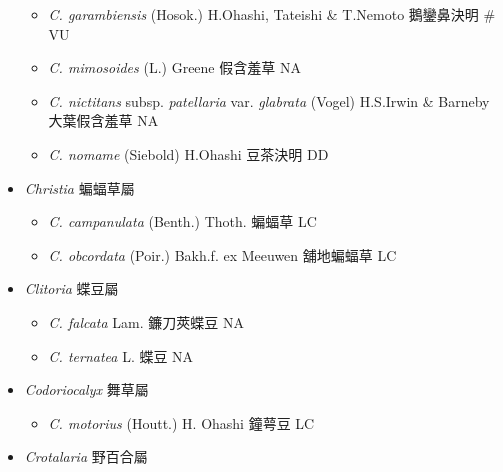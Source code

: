 \begin{itemize}
  \begin{itemize}
        \item[] \textit{C. garambiensis} (Hosok.) H.Ohashi, Tateishi \& T.Nemoto  鵝鑾鼻決明  \# VU
        \item[] \textit{C. mimosoides} (L.) Greene  假含羞草   NA
        \item[] \textit{C. nictitans} subsp. \textit{patellaria} var. \textit{glabrata} (Vogel) H.S.Irwin \& Barneby  大葉假含羞草   NA
        \item[] \textit{C. nomame} (Siebold) H.Ohashi  豆茶決明   DD
  \end{itemize}
 \item[] \textit{Christia} 蝙蝠草屬
                                
  \begin{itemize}
        \item[] \textit{C. campanulata} (Benth.) Thoth.  蝙蝠草   LC
        \item[] \textit{C. obcordata} (Poir.) Bakh.f. ex Meeuwen  舖地蝙蝠草   LC
  \end{itemize}
 \item[] \textit{Clitoria} 蝶豆屬
                                
  \begin{itemize}
        \item[] \textit{C. falcata} Lam.  鐮刀莢蝶豆   NA
        \item[] \textit{C. ternatea} L.  蝶豆   NA
  \end{itemize}
 \item[] \textit{Codoriocalyx} 舞草屬
                                
  \begin{itemize}
        \item[] \textit{C. motorius} (Houtt.) H. Ohashi  鐘萼豆   LC
  \end{itemize}
 \item[] \textit{Crotalaria} 野百合屬
                                

\end{itemize}
